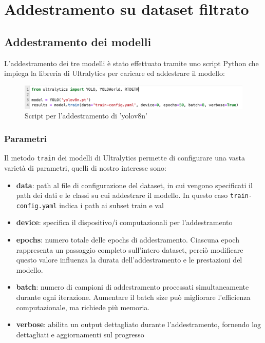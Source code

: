\section{Addestramento su dataset filtrato}

\subsection{Addestramento dei modelli}

L'addestramento dei tre modelli è stato effettuato tramite uno script Python che impiega la libreria di Ultralytics per caricare ed addestrare il modello:

\begin{figure}[ht]
    \centering
    \includegraphics[width=1\textwidth]{files/capitoli/4-sperimentazione-risultati/assets/train-script.png}
    \caption{\label{fig:train-script}Script per l'addestramento di 'yolov8n'}
\end{figure}

\subsubsection{Parametri}
Il metodo \texttt{train}\cite{43} dei modelli di Ultralytics permette di configurare una vasta varietà di parametri, quelli di nostro interesse sono:
\begin{itemize}
    \item \textbf{data}: path al file di configurazione del dataset, in cui vengono specificati il path dei dati e le classi su cui addestrare il modello. In questo caso \texttt{train-config.yaml} indica i path ai subset train e val
    \item \textbf{device}: specifica il dispositivo/i computazionali per l'addestramento
    \item \textbf{epochs}: numero totale delle epochs di addestramento. Ciascuna epoch rappresenta un passaggio completo sull'intero dataset, perciò modificare questo valore influenza la durata dell'addestramento e le prestazioni del modello.
    \item \textbf{batch}: numero di campioni di addestramento processati simultaneamente durante ogni iterazione. Aumentare il batch size può migliorare l'efficienza computazionale, ma richiede più memoria.
    \item \textbf{verbose}: abilita un output dettagliato durante l'addestramento, fornendo log dettagliati e aggiornamenti sul progresso
\end{itemize}

